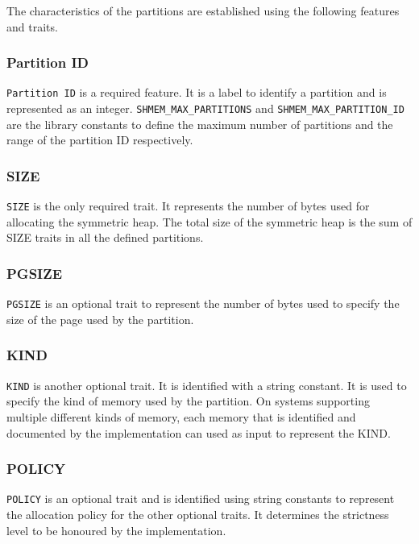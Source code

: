 The characteristics of the partitions are established using the
following features and traits.

\subsubsection{Partition ID} \texttt{Partition ID} is a required
feature. It is a label to identify a partition and is represented
as an integer. \texttt{SHMEM\_MAX\_PARTITIONS} and
\texttt{SHMEM\_MAX\_PARTITION\_ID} are the library constants to
define the maximum number of partitions and the range of
the partition ID respectively.

\subsubsection{SIZE} \texttt{SIZE} is the only required trait. It
represents the number of bytes used for allocating the symmetric
heap. The total size of the symmetric heap is %
the sum of SIZE traits in all the defined partitions.

\subsubsection{PGSIZE} \texttt{PGSIZE} is an optional trait to
represent the number of bytes used to specify the size of the
page used by the partition.

\subsubsection{KIND} \texttt{KIND} is another optional trait.
It is identified with a string constant. It is used to specify
the kind of memory used by the partition. On systems supporting
multiple different kinds of memory, each memory that is identified
and documented by the implementation can used as input to represent
the KIND.

\subsubsection{POLICY} \texttt{POLICY} is an optional trait and
is identified using string constants to represent the %
allocation policy for the other optional traits. It determines
the strictness level to be honoured by the implementation.

